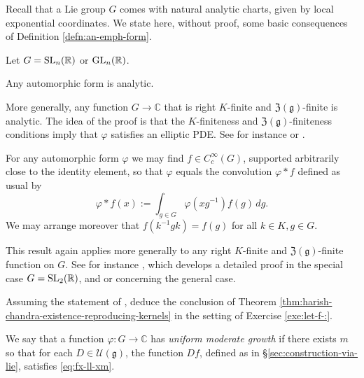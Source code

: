 \documentclass[reqno]{amsart} 
\begin{document}
Recall that a Lie group $G$ comes with natural analytic charts, given by local exponential coordinates.  We state here, without proof, some basic consequences of Definition \ref{defn:an-emph-form}.

Let $G = \operatorname{SL}_n(\mathbb{R})$ or $\operatorname{GL}_n(\mathbb{R})$.
\begin{theorem}
  Any automorphic form is analytic.
\end{theorem}
More generally, any function $G \rightarrow \mathbb{C}$ that is right $K$-finite and $\mathfrak{Z}(\mathfrak{g})$-finite is analytic.  The idea of the proof is that the $K$-finiteness and $\mathfrak{Z}(\mathfrak{g})$-finiteness conditions imply that $\varphi$ satisfies an elliptic PDE.  See for instance \cite[Theorem 2.13]{MR1482800} or \cite[\S3.1]{MR2331343}.

\begin{theorem}\label{thm:harish-chandra-existence-reproducing-kernels}
  For any automorphic form $\varphi$ we may find $f \in C_c^\infty(G)$, supported arbitrarily close to the identity element, so that $\varphi$ equals the convolution $\varphi \ast f$ defined as usual by
  \begin{equation*}
    \varphi \ast f(x) := \int _{g \in G} \varphi(x g^{-1}) f(g) \, d g.
  \end{equation*}
  We may arrange moreover that $f(k^{-1} g k) = f(g)$ for all $k \in K, g \in G$.
\end{theorem}
This result again applies more generally to any right $K$-finite and $\mathfrak{Z}(\mathfrak{g})$-finite function on $G$.  See for instance \cite[Theorem 2.14]{MR1482800}, which develops a detailed proof in the special case $G = \operatorname{SL}_2(\mathbb{R})$, and \cite[Corollary 8.41]{MR855239} or \cite[\S3.2]{MR2331343} concerning the general case.

\begin{exercise}
  Assuming the statement of \cite[Theorem 1.14]{MR1942691}, deduce the conclusion of Theorem \ref{thm:harish-chandra-existence-reproducing-kernels} in the setting of Exercise \ref{exe:let-f-:}.
\end{exercise}

\begin{definition}\label{defn:we-say-that-uniform-moderate-growth}
  We say that a function $\varphi : G \rightarrow \mathbb{C}$ has \emph{uniform moderate growth} if there exists $m$ so that for each $D \in \mathcal{U}(\mathfrak{g})$, the function $D f$, defined as in \S\ref{sec:construction-via-lie}, satisfies \eqref{eq:fx-ll-xm}.
\end{definition}
\end{document}
